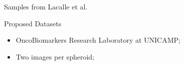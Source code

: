 \begin{frame}{Samples from Lacalle et al.}
\begin{figure}[!htb]
    \end{figure}
\end{frame}

\begin{frame}{Proposed Datasets}
    \begin{itemize}
        \item OncoBiomarkers Research Laboratory at UNICAMP;
        \item Two images per spheroid;
    \end{itemize}
\end{frame}


